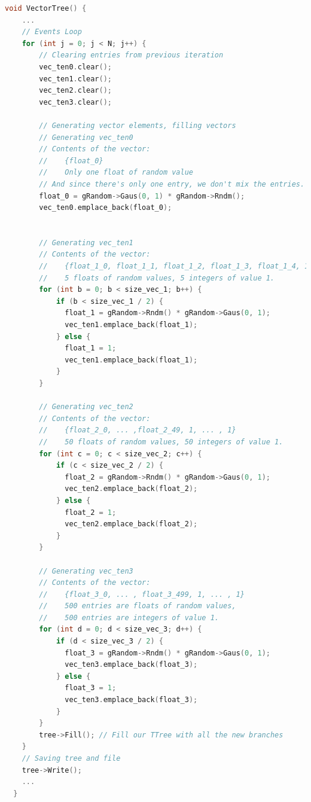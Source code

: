 \begin{lstlisting}[language=C]  
  void VectorTree() {
    ...
    // Events Loop
    for (int j = 0; j < N; j++) {
        // Clearing entries from previous iteration
        vec_ten0.clear();
        vec_ten1.clear();
        vec_ten2.clear();
        vec_ten3.clear();

        // Generating vector elements, filling vectors
        // Generating vec_ten0
        // Contents of the vector:
        //    {float_0}
        //    Only one float of random value
        // And since there's only one entry, we don't mix the entries. 
        float_0 = gRandom->Gaus(0, 1) * gRandom->Rndm();
        vec_ten0.emplace_back(float_0);
        

        // Generating vec_ten1
        // Contents of the vector:
        //    {float_1_0, float_1_1, float_1_2, float_1_3, float_1_4, 1, 1, 1, 1, 1}
        //    5 floats of random values, 5 integers of value 1.
        for (int b = 0; b < size_vec_1; b++) {
            if (b < size_vec_1 / 2) {
              float_1 = gRandom->Rndm() * gRandom->Gaus(0, 1);
              vec_ten1.emplace_back(float_1);
            } else {
              float_1 = 1;
              vec_ten1.emplace_back(float_1);
            }
        }

        // Generating vec_ten2
        // Contents of the vector:
        //    {float_2_0, ... ,float_2_49, 1, ... , 1}
        //    50 floats of random values, 50 integers of value 1.
        for (int c = 0; c < size_vec_2; c++) {
            if (c < size_vec_2 / 2) {
              float_2 = gRandom->Rndm() * gRandom->Gaus(0, 1);
              vec_ten2.emplace_back(float_2);
            } else {
              float_2 = 1;
              vec_ten2.emplace_back(float_2);
            }
        }

        // Generating vec_ten3
        // Contents of the vector:
        //    {float_3_0, ... , float_3_499, 1, ... , 1}
        //    500 entries are floats of random values, 
        //    500 entries are integers of value 1.
        for (int d = 0; d < size_vec_3; d++) {
            if (d < size_vec_3 / 2) {
              float_3 = gRandom->Rndm() * gRandom->Gaus(0, 1);
              vec_ten3.emplace_back(float_3);
            } else {
              float_3 = 1;
              vec_ten3.emplace_back(float_3);
            }
        }
        tree->Fill(); // Fill our TTree with all the new branches
    }
    // Saving tree and file
    tree->Write();
    ...
  }
\end{lstlisting}

